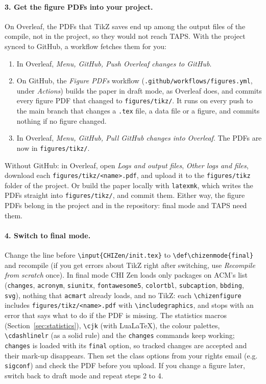 \paragraph{3. Get the figure PDFs into your project.} On Overleaf, the PDFs that TikZ saves end up among the output files of the compile, not in the project, so they would not reach TAPS. With the project synced to GitHub, a workflow fetches them for you:
\begin{enumerate}
    \item In Overleaf, \emph{Menu, GitHub, Push Overleaf changes to GitHub}.
    \item On GitHub, the \emph{Figure PDFs} workflow (\texttt{.github/workflows/figures.yml}, under \emph{Actions}) builds the paper in draft mode, as Overleaf does, and commits every figure PDF that changed to \texttt{figures/tikz/}. It runs on every push to the main branch that changes a \texttt{.tex} file, a data file or a figure, and commits nothing if no figure changed.
    \item In Overleaf, \emph{Menu, GitHub, Pull GitHub changes into Overleaf}. The PDFs are now in \texttt{figures/tikz/}.
\end{enumerate}
Without GitHub: in Overleaf, open \emph{Logs and output files}, \emph{Other logs and files}, download each \texttt{figures/tikz/<name>.pdf}, and upload it to the \texttt{figures/tikz} folder of the project. Or build the paper locally with \texttt{latexmk}, which writes the PDFs straight into \texttt{figures/tikz/}, and commit them. Either way, the figure PDFs belong in the project and in the repository: final mode and TAPS need them.

\paragraph{4. Switch to final mode.} Change the line before \texttt{\textbackslash input\{CHIZen/init.tex\}} to \texttt{\textbackslash def\textbackslash chizenmode\{final\}} and recompile (if you get errors about TikZ right after switching, use \emph{Recompile from scratch} once). In final mode CHI Zen loads only packages on ACM's list (\texttt{changes}, \texttt{acronym}, \texttt{siunitx}, \texttt{fontawesome5}, \texttt{colortbl}, \texttt{subcaption}, \texttt{bbding}, \texttt{svg}), nothing that \texttt{acmart} already loads, and no TikZ: each \texttt{\textbackslash chizenfigure} includes \texttt{figures/tikz/<name>.pdf} with \texttt{\textbackslash includegraphics}, and stops with an error that says what to do if the PDF is missing. The statistics macros (Section~\ref{sec:statistics}), \texttt{\textbackslash cjk} (with LuaLaTeX), the colour palettes, \texttt{\textbackslash cdashlinelr} (as a solid rule) and the \texttt{changes} commands keep working; \texttt{changes} is loaded with its \texttt{final} option, so tracked changes are accepted and their mark-up disappears. Then set the class options from your rights email (e.g. \texttt{sigconf}) and check the PDF before you upload. If you change a figure later, switch back to draft mode and repeat steps 2 to 4.

